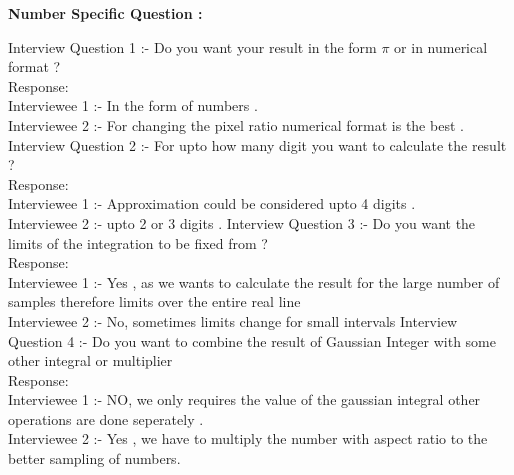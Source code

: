 \documentclass{article}
\begin{document}
\begin{center}
   \textbf{ Number Specific Question :}    
\end{center}
\begin{flushleft}
\hrulefill
\end{flushleft}
\noindent Interview Question 1 :- Do you want your result in the form $\pi$ or in numerical format ?
\\Response:
\\  Interviewee 1 :- In the form of numbers .
\\  Interviewee 2 :- For changing the pixel ratio numerical format is the best . \newline \newline
\noindent Interview Question 2 :- For upto how many digit you want to calculate the result ?
\\Response:
\\  Interviewee 1 :- Approximation could be considered upto 4 digits .
\\  Interviewee 2 :- upto 2 or 3 digits .  \newline \newline
\noindent Interview Question 3 :- Do you want the limits of the integration to be fixed from ?
\\Response:
\\  Interviewee 1 :- Yes , as we wants to calculate the result for the large number of samples therefore limits over the entire real line
\\  Interviewee 2 :- No, sometimes limits change for small intervals\newline \newline
\noindent Interview Question 4 :- Do you want to combine the result of Gaussian Integer with some other integral or multiplier
\\Response:
\\  Interviewee 1 :- NO, we only requires the value of the gaussian integral other operations are done seperately  . 
\\  Interviewee 2 :- Yes , we have to multiply the number with aspect ratio to the better sampling of numbers.  \newline \newline
\end{document}
